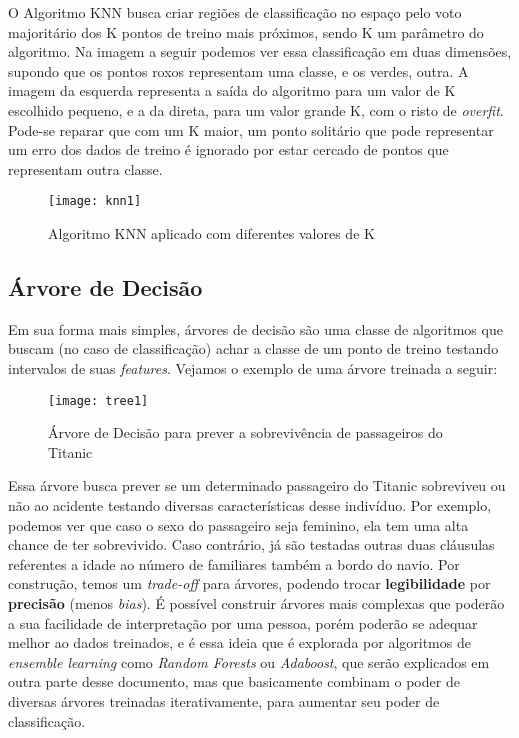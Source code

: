 O Algoritmo KNN busca criar regiões de classificação no espaço pelo voto majoritário dos K pontos de treino mais próximos, sendo K um parâmetro do algoritmo. Na imagem a seguir podemos ver essa classificação em duas dimensões, supondo que os pontos roxos representam uma classe, e os verdes, outra. A imagem da esquerda representa a saída do algoritmo para um valor de K escolhido pequeno, e a da direta, para um valor grande K, com o risto de \textit{overfit}. Pode-se reparar que com um K maior, um ponto solitário que pode representar um erro dos dados de treino é ignorado por estar cercado de pontos que representam outra classe.

\begin{figure}[ht]
	\centering
	\caption{Algoritmo KNN aplicado com diferentes valores de K}
  \texttt{[image: knn1]}
\label{fig:knn1}  

\end{figure}

\subsection{Árvore de Decisão}



Em sua forma mais simples, árvores de decisão são uma classe de algoritmos que buscam (no caso de classificação) achar a classe de um ponto de treino testando intervalos de suas \textit{features}. Vejamos o exemplo de uma árvore treinada a seguir:


\begin{figure}[ht]
	\centering
	\caption{Árvore de Decisão para prever a sobrevivência de passageiros do Titanic}
  \texttt{[image: tree1]}
\label{fig:tree1}  

\end{figure}

Essa árvore busca prever se um determinado passageiro do Titanic sobreviveu ou não ao acidente testando diversas características desse indivíduo. Por exemplo, podemos ver que caso o sexo do passageiro seja feminino, ela tem uma alta chance de ter sobrevivido. Caso contrário, já são testadas outras duas cláusulas referentes a idade ao número de familiares também a bordo do navio. Por construção, temos um \textit{trade-off} para árvores, podendo trocar \textbf{legibilidade} por \textbf{precisão} (menos \textit{bias}). É possível construir árvores mais complexas que poderão a sua facilidade de interpretação por uma pessoa, porém poderão se adequar melhor ao dados treinados, e é essa ideia que é explorada por algoritmos de \textit{ensemble learning} como \textit{Random Forests} ou \textit{Adaboost}, que serão explicados em outra parte desse documento, mas que basicamente combinam o poder de diversas árvores treinadas iterativamente, para aumentar seu poder de classificação.


